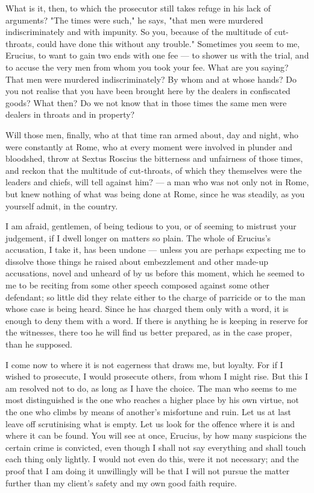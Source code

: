  What is it, then, to which the prosecutor still takes refuge in his lack of arguments? "The times were such," he says, "that men were murdered indiscriminately and with impunity. So you, because of the multitude of cut-throats, could have done this without any trouble." Sometimes you seem to me, Erucius, to want to gain two ends with one fee --- to shower us with the trial, and to accuse the very men from whom you took your fee. What are you saying? That men were murdered indiscriminately? By whom and at whose hands? Do you not realise that you have been brought here by the dealers in confiscated goods? What then? Do we not know that in those times the same men were dealers in throats and in property?

 Will those men, finally, who at that time ran armed about, day and night, who were constantly at Rome, who at every moment were involved in plunder and bloodshed, throw at Sextus Roscius the bitterness and unfairness of those times, and reckon that the multitude of cut-throats, of which they themselves were the leaders and chiefs, will tell against him? --- a man who was not only not in Rome, but knew nothing of what was being done at Rome, since he was steadily, as you yourself admit, in the country.

 I am afraid, gentlemen, of being tedious to you, or of seeming to mistrust your judgement, if I dwell longer on matters so plain. The whole of Erucius's accusation, I take it, has been undone --- unless you are perhaps expecting me to dissolve those things he raised about embezzlement and other made-up accusations, novel and unheard of by us before this moment, which he seemed to me to be reciting from some other speech composed against some other defendant; so little did they relate either to the charge of parricide or to the man whose case is being heard. Since he has charged them only with a word, it is enough to deny them with a word. If there is anything he is keeping in reserve for the witnesses, there too he will find us better prepared, as in the case proper, than he supposed.

 I come now to where it is not eagerness that draws me, but loyalty. For if I wished to prosecute, I would prosecute others, from whom I might rise. But this I am resolved not to do, as long as I have the choice. The man who seems to me most distinguished is the one who reaches a higher place by his own virtue, not the one who climbs by means of another's misfortune and ruin. Let us at last leave off scrutinising what is empty. Let us look for the offence where it is and where it can be found. You will see at once, Erucius, by how many suspicions the certain crime is convicted, even though I shall not say everything and shall touch each thing only lightly. I would not even do this, were it not necessary; and the proof that I am doing it unwillingly will be that I will not pursue the matter further than my client's safety and my own good faith require.

